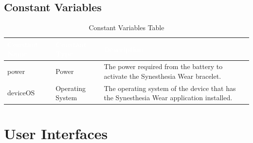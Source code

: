\documentclass[12pt, titlepage]{article}
\begin{document}
\subsection{Constant Variables}
\begin{table}[H]
  \centering
  \caption{Constant Variables Table}
  \label{table:ConstantVar Table} 
  \begin{tabular}{|p{5cm}|p{5cm}|p{5cm}|} 
  \hline
  \rowcolor[rgb]{0.071,0.49,0.698} \textcolor{white}{Constant Name} & \textcolor{white}{Constant Type} & \textcolor{white}{Description}                                          \\ 
  \hline
  \rowcolor[rgb]{0.675,0.827,0.902}    power     & Power &  The power required from the battery to activate the Synesthesia Wear bracelet. \\
  \hline
  \rowcolor[rgb]{0.675,0.827,0.902}    deviceOS     & Operating System &  The operating system of the device that has the Synesthesia Wear application installed. \\
  \hline
  \end{tabular}
\end{table}

\section{User Interfaces}
\end{document}
